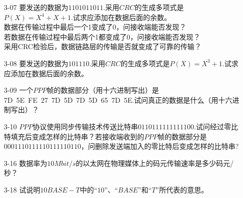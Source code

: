 \documentclass[a4paper,UTF8]{article}
\begin{document}
\courseheader
{}

\begin{enumerate}

\setlength{\itemsep}{3\parskip}

\item[3-07] 要发送的数据为$1101011011$.采用$CRC$的生成多项式是$P(X) = X^4 + X + 1$.试求应添加在数据后面的余数。\\
数据在传输过程中最后一个1变成了0，问接收端能否发现？\\
若数据在传输过程中最后两个1都变成了0，问接收端能否发现？\\
采用CRC检验后，数据链路层的传输是否就变成了可靠的传输？
\begin{solution}

\end{solution}

\item[3-08] 要发送的数据为$101110$.采用$CRC$的生成多项式是$P(X) = X^3 + 1$.试求应添加在数据后面的余数。
\begin{solution}

\end{solution}

\item[3-09]  一个$PPP$帧的数据部分（用十六进制写出）是7D\ 5E\ FE\ 27\ 7D\ 5D\ 7D\ 5D\ 65\ 7D\ 5E.试问真正的数据是什么（用十六进制写出）？
\begin{solution}

\end{solution}

\item[3-10] $PPP$协议使用同步传输技术传送比特串$0110111111111100$.试问经过零比特填充后变成怎样的比特串？若接收端收到的$PPP$帧的数据部分是$0001110111110111110110$，问删除发送端加入的零比特后变成怎样的比特串?
\begin{solution}

\end{solution}

\item[3-16] 数据率为$10Mbit/s$的以太网在物理媒体上的码元传输速率是多少码元/秒？
\begin{solution}

\end{solution}

\item[3-18] 试说明$10BASE-T$中的“$10$”、“$BASE$”和“$T$”所代表的意思。
\begin{solution}

\end{solution}


\end{enumerate}
\end{document}
